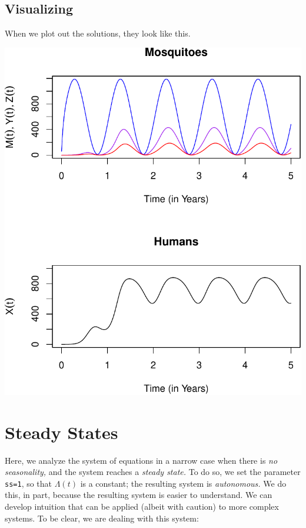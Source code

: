 \documentclass[
]{book}
\begin{document}
\subsection{Visualizing}\label{visualizing-1}

When we plot out the solutions, they look like this.

\includegraphics{docs/figs/unnamed-chunk-75-1.pdf}

\clearpage

\section{Steady States}\label{steady-states-3}

Here, we analyze the system of equations in a narrow case when there is \emph{no seasonality,} and the system reaches a \emph{steady state.} To do so, we set the parameter \texttt{ss=1}, so that \(\Lambda(t)\) is a constant; the resulting system is \emph{autonomous.} We do this, in part, because the resulting system is easier to understand. We can develop intuition that can be applied (albeit with caution) to more complex systems. To be clear, we are dealing with this system:
\end{document}
